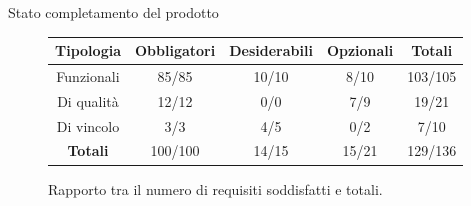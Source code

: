 \documentclass{beamer}
\begin{document}
\begin{frame}{Stato completamento del prodotto}
  \begin{figure}
    \centering
    \normalsize
    \begin{tabular}{|c|c|c|c|c|}
      \hline
      \cellcolor{aziendaPrimary!20}\textbf{Tipologia} & \cellcolor{aziendaPrimary!20}\textbf{Obbligatori}
                                                      & \cellcolor{aziendaPrimary!20}\textbf{Desiderabili} & \cellcolor{aziendaPrimary!20}\textbf{Opzionali}
                                                      & \cellcolor{aziendaPrimary!20}\textbf{Totali}                                                                                                         \\
      \hline
      Funzionali                                      & 85/85                                              & 10/10                                           & 8/10  & 103/105                               \\
      \hline
      Di qualità                                      & 12/12                                              & 0/0                                             & 7/9   & 19/21                                 \\
      \hline
      Di vincolo                                      & 3/3                                                & 4/5                                             & 0/2   & 7/10                                  \\
      \hline
      \cellcolor{aziendaPrimary!20}\textbf{Totali}    & 100/100                                            & 14/15                                           & 15/21 & \cellcolor{aziendaPrimary!20} 129/136 \\
      \hline
    \end{tabular}
    \caption{Rapporto tra il numero di requisiti soddisfatti e totali.}
  \end{figure}
\end{frame}
\end{document}
